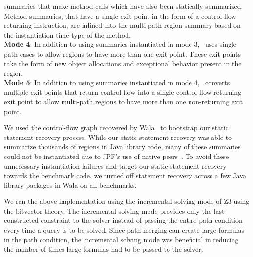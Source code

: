 summaries that make method calls which have also been statically summarized.
%
Method summaries, that have a single exit point in the form of a control-flow returning instruction, are inlined into
the multi-path region summary based on the instantiation-time type of the method.\\
%
\textbf{Mode 4}: In addition to using summaries instantiated in mode 3, \tool\ uses single-path cases to allow
regions to have more than one exit point.
%
These exit points take the form of new object allocations and exceptional behavior present in the region.\\
%
\textbf{Mode 5}: In addition to using summaries instantiated in mode 4, \tool\ converts multiple exit points that return
control flow into a single control flow-returning exit point to allow multi-path regions to have more than one non-returning exit point.

We used the control-flow graph recovered by Wala~\cite{Wala} to bootstrap our static statement recovery process.
%
While our static statement recovery was able to summarize thousands of regions in Java library code, many of these
summaries could not be instantiated due to JPF\rq s use of native peers~\cite{jpf-mji}.
%
To avoid these unnecessary instantiation failures and target our static statement recovery towards the benchmark code,
we turned off statement recovery across a few Java library packages in Wala on all benchmarks.

We ran the above implementation using the incremental solving mode of Z3 using the bitvector theory.
%
The incremental solving mode provides only the last constructed constraint to the solver instead of passing the entire
path condition every time a query is to be solved.
%
Since path-merging can create large formulas in the path condition, the incremental solving mode was beneficial in
reducing the number of times large formulas had to be passed to the solver.
%
